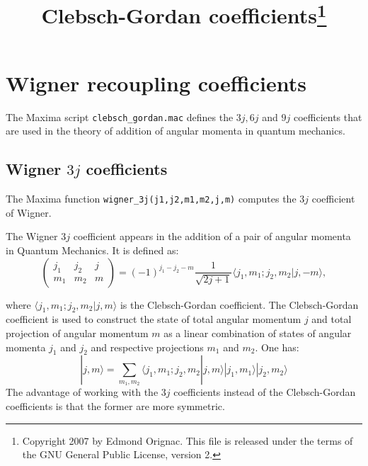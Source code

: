 \documentclass[11pt]{article}
\title{Clebsch-Gordan coefficients\footnote
{Copyright 2007 by Edmond Orignac.
This file is released under the terms of the GNU General Public License, version 2.}}
\begin{document}
\maketitle

\section{Wigner recoupling coefficients}

The Maxima script \texttt{clebsch\_gordan.mac} defines the $3j,6j$ and $9j$ 
 coefficients that are used in the theory of addition of angular momenta 
in quantum mechanics\cite{landau_mecaq,messiah_field_chapter}. 


\subsection{Wigner $3j$ coefficients}

The Maxima function \texttt{wigner\_3j(j1,j2,m1,m2,j,m)} computes the $3j$ 
coefficient of Wigner.

The Wigner $3j$ coefficient appears in the addition of a pair of angular 
momenta in Quantum Mechanics. 
It is defined as\cite{landau_mecaq,messiah_field_chapter}:
\begin{equation}
  \label{eq:3j-def}
  \left(\begin{array}{ccc} j_1 & j_2 & j \\ m_1 & m_2 & m\end{array} \right) = (-1)^{j_1-j_2-m} \frac 1 {\sqrt{2j+1}} \langle j_1,m_1; j_2, m_2 | j,-m\rangle,   
\end{equation} 

where $ \langle j_1,m_1; j_2, m_2 | j,m\rangle$ is the 
Clebsch-Gordan coefficient. The Clebsch-Gordan coefficient is used to 
construct the state of total angular momentum $j$ and total projection 
of angular momentum $m$ as a linear combination of states of angular momenta 
$j_1$ and $j_2$ and respective projections $m_1$ and $m_2$.
One has:
\begin{equation}
  |j,m\rangle = \sum_{m_1,m_2} \langle j_1,m_1;j_2,m_2|j,m\rangle |j_1,m_1\rangle  |j_2,m_2\rangle  
\end{equation}
The advantage of working with the $3j$ coefficients instead of the 
Clebsch-Gordan coefficients is that the former are more symmetric\cite{landau_mecaq}. 
 
\end{document}
